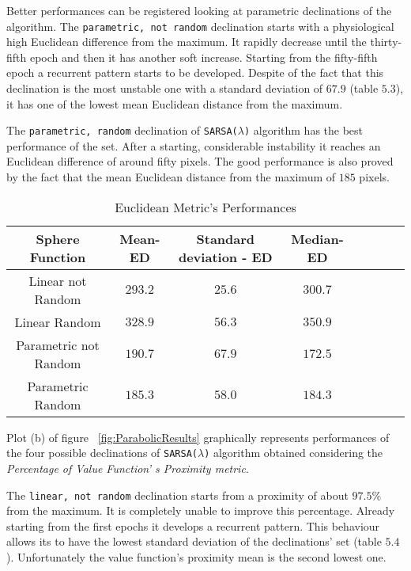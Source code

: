 Better performances can be registered looking at parametric declinations of the algorithm. The {\tt parametric, not random} declination starts with a physiological high Euclidean difference from the maximum. It rapidly decrease until the thirty-fifth epoch and then it has another soft increase. Starting from the fifty-fifth epoch a recurrent pattern starts to be developed. Despite of the fact that this declination is the most unstable one with a standard deviation of $67.9$ (table $5.3$), it has one of the lowest mean Euclidean distance from the maximum. 

The {\tt parametric, random} declination of {\tt SARSA($\lambda$)} algorithm has the best performance of the set. After a starting, considerable instability it reaches an Euclidean difference of around fifty pixels. The good performance is also proved by the fact that the mean Euclidean distance from the maximum of $185$ pixels. \\

\begin{table}[h!]
	\centering
	\resizebox{\linewidth}{!} {
	\begin{tabular}{c| ccccccc} 
		\hline \textbf{Sphere Function}
		& \textbf{Mean-ED} & \textbf{Standard deviation - ED}  &\textbf{Median-ED} \\ 
		\hline Linear not Random
		& $293.2$ &\cellcolor{red!25} $25.6$ & $300.7$  \\ 
		\hline Linear Random
		& $328.9$ & $56.3$ & $350.9$ \\ 
		\hline Parametric not Random
		& $190.7$ & $67.9$ &\cellcolor{red!25} $172.5$ \\ 
		\hline Parametric Random
		& \cellcolor{red!25} $185.3$ & $58.0$ & $184.3$ \\ 
		\hline 
	\end{tabular} 
}
\label{ParabolicTabEuclidean}
\caption{Euclidean Metric's Performances}
\end{table}

Plot (b) of figure ~\ref{fig:ParabolicResults} graphically represents performances of the four possible declinations of {\tt SARSA($\lambda$)} algorithm obtained considering the \textit{Percentage of Value Function' s Proximity metric}. 

The {\tt linear, not random} declination starts from a proximity of about $97.5\%$ from the maximum. It is completely unable to improve this percentage. Already starting from the first epochs it develops a recurrent pattern. This behaviour allows its to have the lowest standard deviation of the declinations' set (table $5.4$). Unfortunately the value function's proximity mean is the second lowest one. 
 
